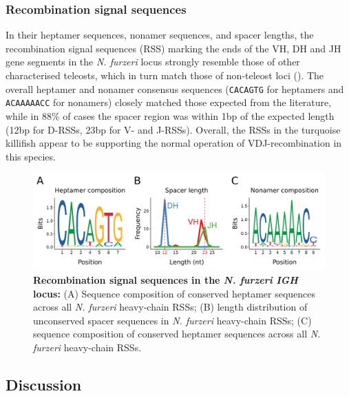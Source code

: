 	\subsubsection{Recombination signal sequences}
	
	In their heptamer sequences, nonamer sequences, and spacer lengths, the recombination signal sequences (RSS) marking the ends of the VH, DH and JH gene segments in the \textit{N. furzeri} locus strongly resemble those of other characterised teleosts, which in turn match those of non-teleost loci (). The overall heptamer and nonamer consensus sequences (\texttt{CACAGTG} for heptamers and \texttt{ACAAAAACC} for nonamers) closely matched those expected from the literature, while in 88\% of cases the spacer region was within 1bp of the expected length (12bp for D-RSSs, 23bp for V- and J-RSSs). Overall, the RSSs in the turquoise killifish appear to be supporting the normal operation of VDJ-recombination in this species.
	
	\begin{figure}
	\includegraphics[width=\textwidth]{_Figures/png/nfu-rss-seqlogo-all}
	\caption[Recombination signal sequences in the \textit{N. furzeri} \textit{IGH} locus]{\textbf{Recombination signal sequences in the \textit{N. furzeri} \textit{IGH} locus:} (A) Sequence composition of conserved heptamer sequences across all \textit{N. furzeri} heavy-chain RSSs; (B) length distribution of unconserved spacer sequences in \textit{N. furzeri} heavy-chain RSSs; (C) sequence composition of conserved heptamer sequences across all \textit{N. furzeri} heavy-chain RSSs.}
	\label{fig:nfu-rss-seqlogo-all}
	\end{figure} %
	
	



	
	\subsection{Discussion}
	
